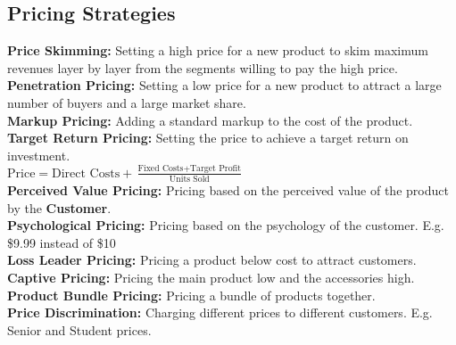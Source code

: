 \begin{center}
\end{center}

\subsection{Pricing Strategies}
\textbf{Price Skimming:} Setting a high price for a new product to skim maximum revenues layer by layer from the segments willing to pay the high price.\\
\textbf{Penetration Pricing:} Setting a low price for a new product to attract a large number of buyers and a large market share.\\
\textbf{Markup Pricing:} Adding a standard markup to the cost of the product.\\
\textbf{Target Return Pricing:} Setting the price to achieve a target return on investment.\\
$\text{Price} = \text{Direct Costs} + \frac{\text{Fixed Costs} + \text{Target Profit}}{\text{Units Sold}}$\\
\textbf{Perceived Value Pricing:} Pricing based on the perceived value of the product by the \textbf{Customer}.\\
\textbf{Psychological Pricing:} Pricing based on the psychology of the customer. E.g. \$9.99 instead of \$10\\
\textbf{Loss Leader Pricing:} Pricing a product below cost to attract customers.\\
\textbf{Captive Pricing:} Pricing the main product low and the accessories high.\\
\textbf{Product Bundle Pricing:} Pricing a bundle of products together.\\
\textbf{Price Discrimination:} Charging different prices to different customers. E.g. Senior and Student prices.\\
